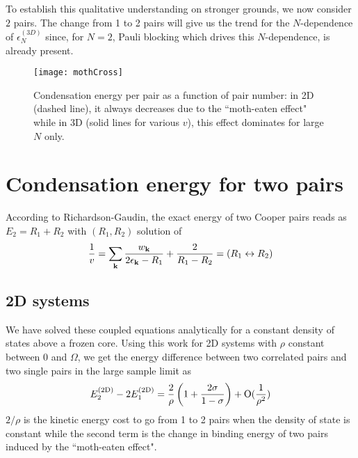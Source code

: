 \documentclass[5p,twocolumn]{elsarticle}
\begin{document}
To establish this qualitative understanding on stronger  grounds, we now consider $2$ pairs. The change from 1 to 2 pairs will give us the trend for the $N$-dependence of $\epsilon^{(3D)}_N$ since, for $N=2$, Pauli blocking which drives this $N$-dependence, is already present.  

\begin{figure}[htb]
	\centering
		\texttt{[image: mothCross]}
	\caption{Condensation energy per pair as a function of pair number: in 2D (dashed line), it always decreases due to the ``moth-eaten effect" while in 3D (solid lines for various $v$), this effect dominates for large $N$ only.}
	\label{fig:3dCondChange}
\end{figure}

\section{Condensation energy for two pairs\label{sec:twoPair}}
According to Richardson-Gaudin, the exact energy of two Cooper pairs reads as $E_2=R_1+R_2$ with $(R_1,R_2)$ solution of
\begin{equation}
\frac{1}{v}=\sum_{\mathbf{k}}\frac{w_{\mathbf{k}}}{2\epsilon_{\mathbf{k}}-R_1}+\frac{2}{R_1-R_2}=(R_{1}\leftrightarrow{}R_{2})
\label{eq:richardsonEq}
\end{equation}
\subsection{2D systems}
We have solved these coupled equations analytically for a constant density of states above a frozen core\cite{combescotBCS}.  Using  this work  for 2D systems with $\rho$ constant between $0$ and $\Omega$, we get the energy difference between two correlated pairs and two single pairs in the large sample limit as 
\begin{equation}
E^{{{\text{(2D)}}}}_2-2E_1^{{{\text{(2D)}}}}=\frac{2}{\rho}\left(1+\frac{2\sigma}{1-\sigma}\right)+\text{O}(\frac{1}{\rho^2})
\label{eq:}
\end{equation}
 $2/\rho$ is the kinetic energy cost to go from 1 to 2 pairs when the density of state is constant while the second term is the change in binding energy of two pairs induced by the ``moth-eaten effect". 
\end{document}
